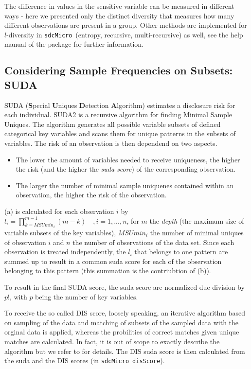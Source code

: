 \documentclass[12pt]{article}
\newcommand{\sdcMicro}{\texttt{sdcMicro}}
\begin{document}
The difference in values in the sensitive variable can be measured in different ways - here we presented only
the distinct diversity that measures how many different observations are present in a group. Other methods
are implemented for $l$-diversity in \sdcMicro \ (entropy, recursive, multi-recursive) as well, see the help
manual of the package for further information.


\subsection{Considering Sample Frequencies on Subsets: SUDA}\label{method:suda}

SUDA 
 (\textbf{S}pecial \textbf{U}niques \textbf{D}etection \textbf{A}lgorithm) 
estimates a disclosure risk for each individual. 
 SUDA2 \citep[see, e.g.,][]{manning08} is a recursive algorithm for finding
Minimal Sample Uniques. The algorithm generates all possible
variable subsets of defined categorical key variables 
and scans them for unique patterns in the subsets of variables. The risk of an observation is then dependend on two 
aspects.
\begin{itemize}
\item[(a)] The lower the
amount of variables needed to receive uniqueness, the higher the risk (and the higher the 
\textit{suda score}) of the
corresponding observation. 
\item[(b)] The larger the number of
minimal sample uniquenes contained within an observation, the higher the risk of the observation.
\end{itemize}

(a) is calculated for each observation $i$ by $l_i = \prod_{k=MSUmin_i}^{m-1} (m-k) \quad , i=1,...,n$, 
for $m$ the \textit{depth} (the maximum size of variable subsets of the key variables),  
$MSUmin_i$ the number of minimal uniques of observation $i$ and $n$ the 
number of observations of the data set. 
Since each observation is treated independently, the $l_i$ that belongs to one pattern are summed up 
to result in a common suda score for each of the observation belonging to this pattern 
(this summation is the contriubtion of (b)).

To result in the final SUDA score, the suda score are normalized due division 
by $p!$, with $p$ being the number of key variables.

To receive the so called DIS score, 
loosely speaking, an iterative algorithm based on sampling of the data and matching of subsets of the sampled data 
with the orginal data is applied, 
whereas the probilities of correct matches given unique matches are
calculated. In fact, it is out of scope to exactly describe the algorithm but we refer to
\cite{Elliot00} for details. The DIS suda score is
then calculated from the suda and the DIS scores
(in \sdcMicro \ \texttt{disScore}).
\end{document}

